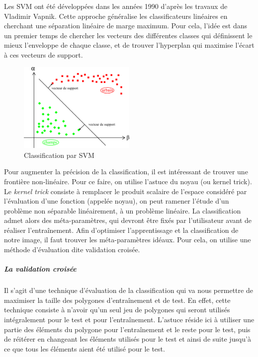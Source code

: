 \documentclass[a4paper,10pt]{report}
\begin{document}
Les SVM ont été développées dans les années 1990 d'après les travaux de Vladimir Vapnik. Cette approche généralise les classificateurs linéaires en cherchant une séparation linéaire de marge maximum. Pour cela, l'idée est dans un premier temps de chercher les vecteurs des différentes classes qui définissent le mieux l'enveloppe de chaque classe, et de trouver l'hyperplan qui maximise l'écart à ces vecteurs de support.

\begin{figure}[H]
  \centering
    \includegraphics[width=0.5\textwidth]{ml_svm}
  \caption{Classification par SVM}
  \label{fig:ml_svm}
\end{figure}

Pour augmenter la précision de la classification, il est intéressant de trouver une frontière non-linéaire. Pour ce faire, on utilise l'astuce du noyau (ou kernel trick). Le \textit{kernel trick}\cite{aizermanSVM} consiste à remplacer le produit scalaire de l'espace considéré par l'évaluation d'une fonction (appelée noyau), on peut ramener l'étude d'un problème non séparable linéairement, à un problème linéaire. La classification admet alors des méta-paramètres, qui devront être fixés par l'utilisateur avant de réaliser l'entraînement. Afin d'optimiser l'apprentissage et la classification de notre image, il faut trouver les méta-paramètres idéaux. Pour cela, on utilise une méthode d'évaluation dite validation croisée.

\subparagraph{La validation croisée\newline}
Il s'agit d'une technique d'évaluation de la classification qui va nous permettre de maximiser la taille des polygones d'entraînement et de test. En effet, cette technique consiste à n'avoir qu'un seul jeu de polygones qui seront utilisés intégralement pour le test et pour l'entraînement. L'astuce réside ici à utiliser une partie des éléments du polygone pour l'entraînement et le reste pour le test, puis de réitérer en changeant les éléments utilisés pour le test et ainsi de suite jusqu'à ce que tous les éléments aient été utilisé pour le test.

\end{document}
